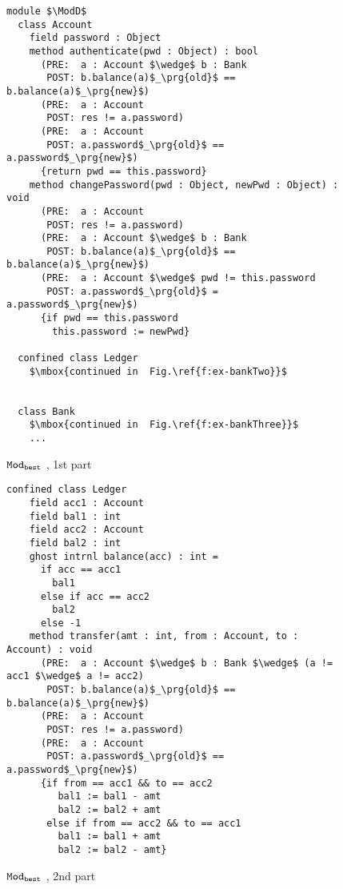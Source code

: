 \begin{figure}[htb]
\begin{lstlisting}[mathescape=true, frame=lines]
module $\ModD$
  class Account
    field password : Object
    method authenticate(pwd : Object) : bool
      (PRE:  a : Account $\wedge$ b : Bank
       POST: b.balance(a)$_\prg{old}$ == b.balance(a)$_\prg{new}$)
      (PRE:  a : Account
       POST: res != a.password)
      (PRE:  a : Account
       POST: a.password$_\prg{old}$ == a.password$_\prg{new}$)
      {return pwd == this.password}
    method changePassword(pwd : Object, newPwd : Object) : void
      (PRE:  a : Account
       POST: res != a.password)
      (PRE:  a : Account $\wedge$ b : Bank
       POST: b.balance(a)$_\prg{old}$ == b.balance(a)$_\prg{new}$)
      (PRE:  a : Account $\wedge$ pwd != this.password
       POST: a.password$_\prg{old}$ = a.password$_\prg{new}$)
      {if pwd == this.password
        this.password := newPwd}

  confined class Ledger
    $\mbox{continued in  Fig.\ref{f:ex-bankTwo}}$
      

  class Bank
    $\mbox{continued in  Fig.\ref{f:ex-bankThree}}$
    ...
\end{lstlisting}
\caption{${\texttt{Mod}}_{{\texttt{best}}}$ \funcSpecs, 1st part}
\label{f:ex-bankOne}
\end{figure}

\begin{figure}[htb]
\begin{lstlisting}[mathescape=true, frame=lines]
  confined class Ledger
    field acc1 : Account
    field bal1 : int
    field acc2 : Account
    field bal2 : int
    ghost intrnl balance(acc) : int = 
      if acc == acc1
        bal1
      else if acc == acc2
        bal2
      else -1
    method transfer(amt : int, from : Account, to : Account) : void
      (PRE:  a : Account $\wedge$ b : Bank $\wedge$ (a != acc1 $\wedge$ a != acc2)
       POST: b.balance(a)$_\prg{old}$ == b.balance(a)$_\prg{new}$)
      (PRE:  a : Account
       POST: res != a.password)
      (PRE:  a : Account
       POST: a.password$_\prg{old}$ == a.password$_\prg{new}$)
      {if from == acc1 && to == acc2
         bal1 := bal1 - amt
         bal2 := bal2 + amt
       else if from == acc2 && to == acc1
         bal1 := bal1 + amt
         bal2 := bal2 - amt}
\end{lstlisting}
\caption{${\texttt{Mod}}_{{\texttt{best}}}$ \funcSpecs, 2nd part}
\label{f:ex-bankTwo}
\end{figure}


